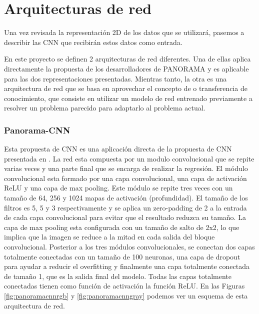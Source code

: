 \newpage

\section{Arquitecturas de red}
\label{sec:arquitecturas}

Una vez revisada la representación 2D de los datos que se utilizará, pasemos a describir las CNN que recibirán estos datos como entrada. 

En este proyecto se definen 2 arquitecturas de red diferentes. Una de ellas aplica directamente la propuesta de los desarrolladores de PANORAMA y es aplicable para las dos representaciones presentadas. Mientras tanto, la otra es una arquitectura de red que se basa en aprovechar el concepto de  o transferencia de conocimiento, que consiste en utilizar un modelo de red entrenado previamente a resolver un problema parecido para adaptarlo al problema actual.

\subsubsection{Panorama-CNN}

Esta propuesta de CNN es una aplicación directa de la propuesta de CNN presentada en \cite{sfikas2017exploiting, SFIKAS2018208}. La red esta compuesta por un modulo convolucional que se repite varias veces y una parte final que se encarga de realizar la regresión. El módulo convolucional esta formado por una capa convolucional, una capa de activación ReLU y una capa de max pooling. Este módulo se repite tres veces con un tamaño de 64, 256 y 1024 mapas de activación (profundidad). El tamaño de los filtros es 5, 5 y 3 respectivamente y se aplica un zero-padding de 2 a la entrada de cada capa convolucional para evitar que el resultado reduzca su tamaño. La capa de max pooling esta configurada con un tamaño de salto de 2x2, lo que implica que la imagen se reduce a la mitad en cada salida del bloque convolucional. Posterior a los tres módulos convolucionales, se conectan dos capas totalmente conectadas con un tamaño de 100 neuronas, una capa de dropout para ayudar a reducir el overfitting y finalmente una capa totalmente conectada de tamaño 1, que es la salida final del modelo. Todas las capas totalmente conectadas tienen como función de activación la función ReLU. En las Figuras \ref{fig:panoramacnnrgb} y \ref{fig:panoramacnngray} podemos ver un esquema de esta arquitectura de red.\\

